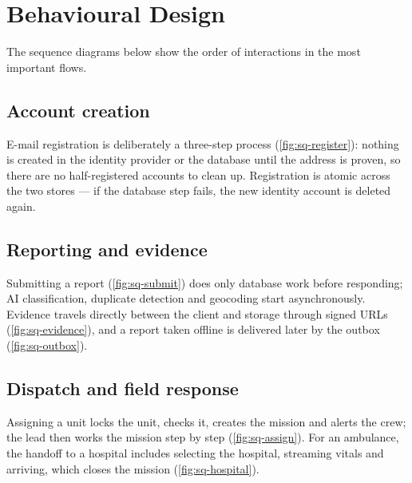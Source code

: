 \section{Behavioural Design}

The sequence diagrams below show the order of interactions in the most important flows.

\subsection{Account creation}
E-mail registration is deliberately a three-step process (\cref{fig:sq-register}): nothing is created in the identity
provider or the database until the address is proven, so there are no half-registered accounts to clean up. Registration
is atomic across the two stores --- if the database step fails, the new identity account is deleted again.

\subsection{Reporting and evidence}
Submitting a report (\cref{fig:sq-submit}) does only database work before responding; AI classification, duplicate
detection and geocoding start asynchronously. Evidence travels directly between the client and storage through
signed URLs (\cref{fig:sq-evidence}), and a report taken offline is delivered later by the outbox
(\cref{fig:sq-outbox}).

\subsection{Dispatch and field response}
Assigning a unit locks the unit, checks it, creates the mission and alerts the crew; the lead then works the mission step
by step (\cref{fig:sq-assign}). For an ambulance, the handoff to a hospital includes selecting the hospital, streaming
vitals and arriving, which closes the mission (\cref{fig:sq-hospital}).

